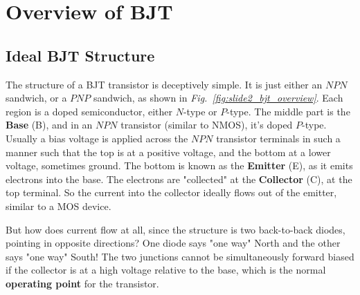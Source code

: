 \section{Overview of BJT}
\subsection{Ideal BJT Structure}
The structure of a BJT transistor is deceptively simple.  It is just either an $NPN$ sandwich, or a $PNP$ sandwich, as shown in \emph{Fig.~\ref{fig:slide2_bjt_overview}}.  Each region is a doped semiconductor, either $N$-type or $P$-type.  The middle part is the \textbf{Base} (B), and in an $NPN$ transistor (similar to NMOS), it's doped $P$-type.  Usually a bias voltage is applied across the $NPN$ transistor terminals in such a manner such that the top is at a positive voltage, and the bottom at a lower voltage, sometimes ground.  The bottom is known as the \textbf{Emitter} (E), as it emits electrons into the base.  The electrons are "collected" at the \textbf{Collector} (C), at the top terminal.  So the current into the collector ideally flows out of the emitter, similar to a MOS device.

But how does current flow at all, since the structure is two back-to-back diodes, pointing in opposite directions?  One diode says "one way" North and the other says "one way" South!  The two junctions cannot be simultaneously forward biased if the collector is at a high voltage relative to the base, which is the normal \textbf{operating point} for the transistor.

